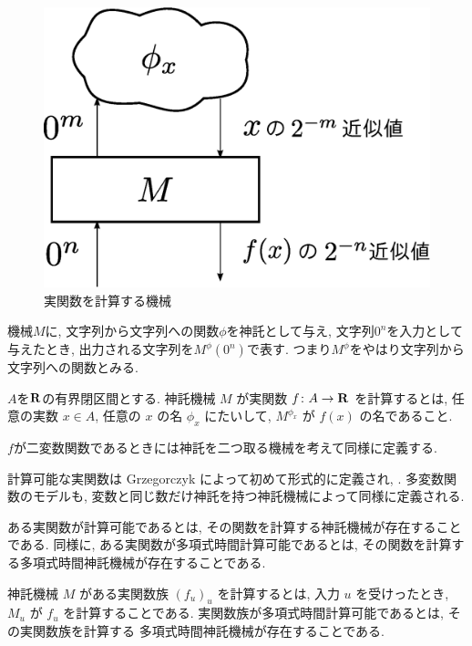  \begin{figure}
  \label{fig:model-of-function}
  \begin{center}
   \includegraphics[height=0.15\textheight]{image/model-of-function.eps}
  \end{center}
  \caption{実関数を計算する機械}
 \end{figure}

機械$M$に, 
文字列から文字列への関数$\phi$を神託として与え, 
文字列$0 ^n$を入力として与えたとき, 
出力される文字列を$M ^\phi (0 ^n)$で表す. 
つまり$M ^\phi$をやはり文字列から文字列への関数とみる. 

\begin{definition}
$A$を$\mathbf R$の有界閉区間とする. 
神託機械 $M$ が実関数 $f\colon A \to \mathbf R$ を計算するとは,
任意の実数 $x \in A$, 任意の $x$ の名 $\phi_x$ にたいして,
$M^{\phi_x}$ が $f(x)$ の名であること.
\end{definition}

$f$が二変数関数であるときには神託を二つ取る機械を考えて同様に定義する. 

 計算可能な実関数は Grzegorczyk によって初めて形式的に定義され,
 \cite{grzegorczyk1955computable}.
 多変数関数のモデルも, 変数と同じ数だけ神託を持つ神託機械によって同様に定義される.

 ある実関数が計算可能であるとは, その関数を計算する神託機械が存在することである.
 同様に, ある実関数が多項式時間計算可能であるとは, その関数を計算する多項式時間神託機械が存在することである.

 神託機械 $M$ がある実関数族 $(f_u)_u$ を計算するとは,
 入力 $u$ を受けったとき, $M_u$ が $f_u$ を計算することである.
 実関数族が多項式時間計算可能であるとは, その実関数族を計算する
 多項式時間神託機械が存在することである.
 

